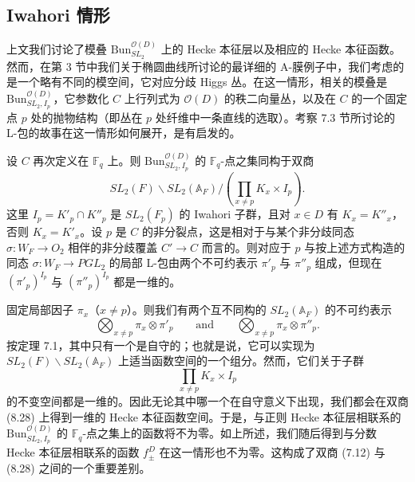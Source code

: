 \documentclass[11pt,a4paper]{article}
\newcommand{\Bun}{\mathrm{Bun}}
\begin{document}
\subsection{Iwahori 情形}

上文我们讨论了模叠 $\Bun^{\mathcal{O}(D)}_{SL_2}$ 上的 Hecke 本征层以及相应的 Hecke 本征函数。然而，在第 3 节中我们关于椭圆曲线所讨论的最详细的 A-膜例子中，我们考虑的是一个略有不同的模空间，它对应分歧 Higgs 丛。在这一情形，相关的模叠是 $\Bun^{\mathcal{O}(D)}_{SL_2,I_p}$，它参数化 $C$ 上行列式为 $\mathcal{O}(D)$ 的秩二向量丛，以及在 $C$ 的一个固定点 $p$ 处的抛物结构（即丛在 $p$ 处纤维中一条直线的选取）。考察 7.3 节所讨论的 L-包的故事在这一情形如何展开，是有启发的。

设 $C$ 再次定义在 $\mathbb{F}_q$ 上。则 $\Bun^{\mathcal{O}(D)}_{SL_2,I_p}$ 的 $\mathbb{F}_q$-点之集同构于双商
\begin{equation}\tag{8.28}
SL_2(F)\backslash SL_2(\mathbb{A}_F)\Big/\left(\prod_{x\neq p} K_x\times I_p\right).
\end{equation}
这里 $I_p = K'_p\cap K''_p$ 是 $SL_2(F_p)$ 的 Iwahori 子群，且对 $x\in D$ 有 $K_x = K''_x$，否则 $K_x = K'_x$。设 $p$ 是 $C$ 的非分裂点，这是相对于与某个非分歧同态 $\sigma : W_F \to O_2$ 相伴的非分歧覆盖 $C'\to C$ 而言的。则对应于 $p$ 与按上述方式构造的同态 $\sigma : W_F \to PGL_2$ 的局部 L-包由两个不可约表示 $\pi'_p$ 与 $\pi''_p$ 组成，但现在 $(\pi'_p)^{I_p}$ 与 $(\pi''_p)^{I_p}$ 都是一维的。

固定局部因子 $\pi_x$（$x\neq p$）。则我们有两个互不同构的 $SL_2(\mathbb{A}_F)$ 的不可约表示
\[
\bigotimes_{x\neq p}\pi_x\otimes \pi'_p \qquad\text{and}\qquad \bigotimes_{x\neq p}\pi_x\otimes \pi''_p.
\]
按定理 7.1，其中只有一个是自守的；也就是说，它可以实现为 $SL_2(F)\backslash SL_2(\mathbb{A}_F)$ 上适当函数空间的一个组分。然而，它们关于子群
\[
\prod_{x\neq p} K_x\times I_p
\]
的不变空间都是一维的。因此无论其中哪一个在自守意义下出现，我们都会在双商
(8.28) 上得到一维的 Hecke 本征函数空间。于是，与正则 Hecke 本征层相联系的 $\Bun^{\mathcal{O}(D)}_{SL_2,I_p}$ 的 $\mathbb{F}_q$-点之集上的函数将不为零。如上所述，我们随后得到与分数 Hecke 本征层相联系的函数 $f^D_\pm$ 在这一情形也不为零。这构成了双商 (7.12) 与 (8.28) 之间的一个重要差别。

\end{document}
